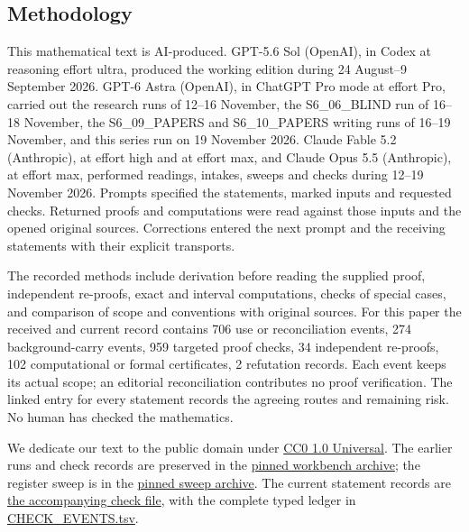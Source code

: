 \subsection{Methodology}
This mathematical text is AI-produced. GPT-5.6 Sol (OpenAI), in
Codex at reasoning effort ultra, produced the working edition during
24 August--9 September 2026. GPT-6 Astra (OpenAI), in ChatGPT Pro
mode at effort Pro, carried out the research runs of 12--16 November,
the S6\_06\_BLIND run of 16--18 November, the S6\_09\_PAPERS and
S6\_10\_PAPERS writing runs of 16--19 November, and this series run
on 19 November 2026. Claude Fable 5.2 (Anthropic), at effort high and
at effort max, and Claude Opus 5.5 (Anthropic), at effort max,
performed readings, intakes, sweeps and checks during 12--19 November
2026. Prompts specified the statements, marked inputs and requested
checks. Returned proofs and computations were read against those
inputs and the opened original sources. Corrections entered the next
prompt and the receiving statements with their explicit transports.

The recorded methods include derivation before reading the supplied
proof, independent re-proofs, exact and interval computations,
checks of special cases, and comparison of scope and conventions
with original sources. For this paper the received and current
record contains 706 use or reconciliation events, 274 background-carry events, 959 targeted proof checks, 34 independent re-proofs, 102 computational or formal certificates, 2 refutation records.
Each event keeps its actual scope; an editorial reconciliation
contributes no proof verification. The linked entry for every
statement records the agreeing routes and remaining risk.
No human has checked the mathematics.

We dedicate our text to the public domain under
\href{https://creativecommons.org/publicdomain/zero/1.0/}{CC0 1.0 Universal}.
The earlier runs and check records are preserved in the
\href{https://github.com/KokunoYumeto/s6-complex-structure-workbench/tree/4e8b547874c2acff6b49713ca96f84b281ab5793}{pinned workbench archive};
the register sweep is in the
\href{https://github.com/KokunoYumeto/grothendieck-montpellier-archive/tree/96b2bcaec355870a8faa9457406673b7cd897654/raw/results_register/sweep1_s6}{pinned sweep archive}.
The current statement records are
\href{S6_SERIES_GRIND_checks_II.md}{the accompanying check file},
with the complete typed ledger in \href{CHECK_EVENTS.tsv}{CHECK\_EVENTS.tsv}.
